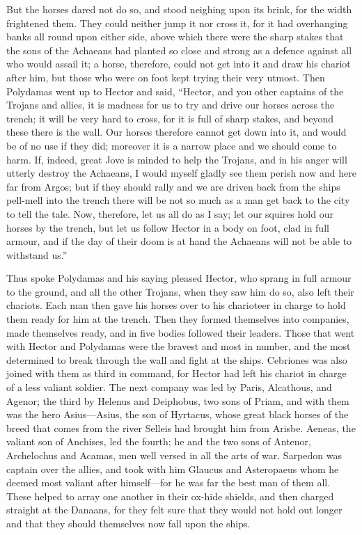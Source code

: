But the horses dared not do so, and stood neighing upon its brink, for the
width frightened them. They could neither jump it nor cross it, for it had
overhanging banks all round upon either side, above which there were the
sharp stakes that the sons of the Achaeans had planted so close and strong
as a defence against all who would assail it; a horse, therefore, could
not get into it and draw his chariot after him, but those who were on foot
kept trying their very utmost. Then Polydamas went up to Hector and said,
“Hector, and you other captains of the Trojans and allies, it is madness
for us to try and drive our horses across the trench; it will be very hard
to cross, for it is full of sharp stakes, and beyond these there is the
wall. Our horses therefore cannot get down into it, and would be of no use
if they did; moreover it is a narrow place and we should come to harm. If,
indeed, great Jove is minded to help the Trojans, and in his anger will
utterly destroy the Achaeans, I would myself gladly see them perish now
and here far from Argos; but if they should rally and we are driven back
from the ships pell-mell into the trench there will be not so much as a
man get back to the city to tell the tale. Now, therefore, let us all do
as I say; let our squires hold our horses by the trench, but let us follow
Hector in a body on foot, clad in full armour, and if the day of their
doom is at hand the Achaeans will not be able to withstand us.”

Thus spoke Polydamas and his saying pleased Hector, who sprang in full
armour to the ground, and all the other Trojans, when they saw him do so,
also left their chariots. Each man then gave his horses over to his
charioteer in charge to hold them ready for him at the trench. Then they
formed themselves into companies, made themselves ready, and in five
bodies followed their leaders. Those that went with Hector and Polydamas
were the bravest and most in number, and the most determined to break
through the wall and fight at the ships. Cebriones was also joined with
them as third in command, for Hector had left his chariot in charge of a
less valiant soldier. The next company was led by Paris, Alcathous, and
Agenor; the third by Helenus and Deiphobus, two sons of Priam, and with
them was the hero Asius—Asius, the son of Hyrtacus, whose great
black horses of the breed that comes from the river Selleis had brought
him from Arisbe. Aeneas, the valiant son of Anchises, led the fourth; he
and the two sons of Antenor, Archelochus and Acamas, men well versed in
all the arts of war. Sarpedon was captain over the allies, and took with
him Glaucus and Asteropaeus whom he deemed most valiant after himself—for
he was far the best man of them all. These helped to array one another in
their ox-hide shields, and then charged straight at the Danaans, for they
felt sure that they would not hold out longer and that they should
themselves now fall upon the ships.

